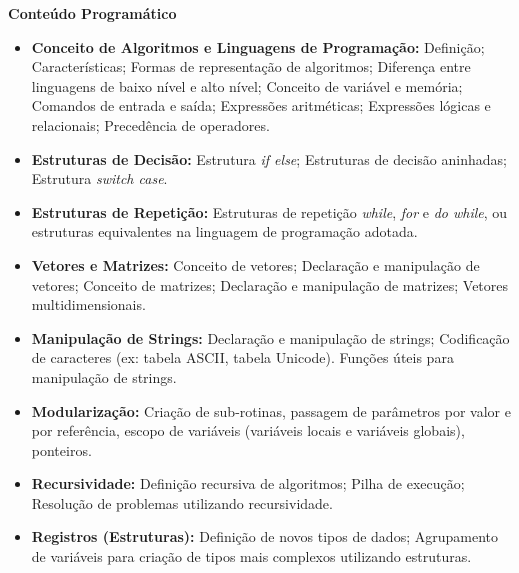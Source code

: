 
\begin{snugshade}\begin{center}\textbf{
    Conteúdo Programático
}\end{center}\end{snugshade}

\begin{itemize}

 \item \textbf{Conceito de Algoritmos e Linguagens de Programação:} Defini\c{c}\~ao; Caracter\'isticas; Formas de representa\c{c}\~ao de algoritmos; Diferen\c{c}a entre linguagens de baixo n\'ivel e alto n\'ivel; Conceito de vari\'avel e mem\'oria; Comandos de entrada e saída; Express\~oes aritm\'eticas; Express\~oes l\'ogicas e relacionais; Preced\^encia de operadores.

 \item \textbf{Estruturas de Decisão:} Estrutura \textit{if else}; Estruturas de decis\~ao aninhadas; Estrutura \textit{switch case}.

 \item \textbf{Estruturas de Repetição:} Estruturas de repeti\c{c}\~ao \textit{while}, \textit{for} e \textit{do while}, ou estruturas equivalentes na linguagem de programa\c{c}\~ao adotada.

 \item \textbf{Vetores e Matrizes:} Conceito de vetores; Declara\c{c}\~ao e manipula\c{c}\~ao de vetores; Conceito de matrizes; Declara\c{c}\~ao e manipula\c{c}\~ao de matrizes; Vetores multidimensionais.

 \item \textbf{Manipulação de Strings:} Declara\c{c}\~ao e manipula\c{c}\~ao de strings; Codifica\c{c}\~ao de caracteres (ex: tabela ASCII, tabela Unicode). Fun\c{c}\~oes \'uteis para manipula\c{c}\~ao de strings.

 \item \textbf{Modulariza\c{c}\~ao:} Criação de sub-rotinas, passagem de parâmetros por valor e por refer\^encia, escopo de variáveis (variáveis locais e variáveis globais), ponteiros.

 \item \textbf{Recursividade:} Defini\c{c}\~ao recursiva de algoritmos; Pilha de execu\c{c}\~ao; Resolu\c{c}\~ao de problemas utilizando recursividade.

 \item \textbf{Registros (Estruturas):} Defini\c{c}\~ao de novos tipos de dados; Agrupamento de vari\'aveis para cria\c{c}\~ao de tipos mais complexos utilizando estruturas.

\end{itemize}

